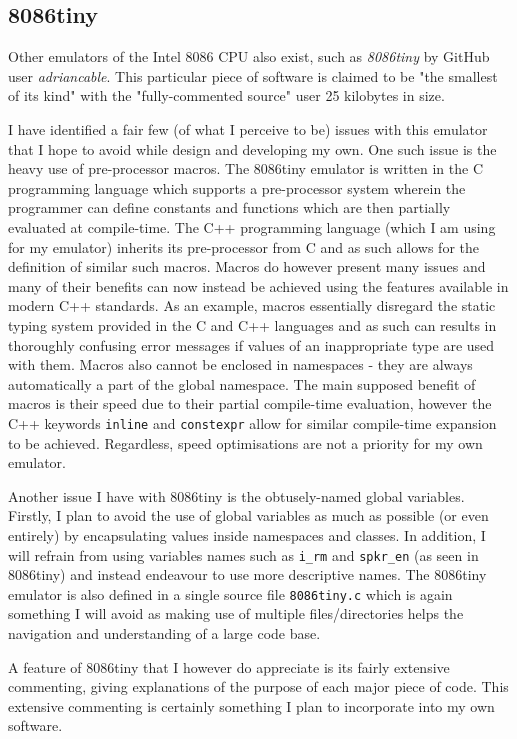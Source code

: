     \subsection{8086tiny}
        Other emulators of the Intel 8086 CPU also exist, such as \textit{8086tiny} by GitHub user \textit{adriancable}. This particular piece of software is claimed to be "the smallest of its kind" with the "fully-commented source" user 25 kilobytes in size.

        I have identified a fair few (of what I perceive to be) issues with this emulator that I hope to avoid while design and developing my own. One such issue is the heavy use of pre-processor macros. The 8086tiny emulator is written in the C programming language which supports a pre-processor system wherein the programmer can define constants and functions which are then partially evaluated at compile-time. The C++ programming language (which I am using for my emulator) inherits its pre-processor from C and as such allows for the definition of similar such macros. Macros do however present many issues and many of their benefits can now instead be achieved using the features available in modern C++ standards. As an example, macros essentially disregard the static typing system provided in the C and C++ languages and as such can results in thoroughly confusing error messages if values of an inappropriate type are used with them. Macros also cannot be enclosed in namespaces - they are always automatically a part of the global namespace. The main supposed benefit of macros is their speed due to their partial compile-time evaluation, however the C++ keywords \texttt{inline} and \texttt{constexpr} allow for similar compile-time expansion to be achieved. Regardless, speed optimisations are not a priority for my own emulator.

        Another issue I have with 8086tiny is the obtusely-named global variables. Firstly, I plan to avoid the use of global variables as much as possible (or even entirely) by encapsulating values inside namespaces and classes. In addition, I will refrain from using variables names such as \texttt{i\_rm} and \texttt{spkr\_en} (as seen in 8086tiny) and instead endeavour to use more descriptive names. The 8086tiny emulator is also defined in a single source file \texttt{8086tiny.c} which is again something I will avoid as making use of multiple files/directories helps the navigation and understanding of a large code base.

        A feature of 8086tiny that I however do appreciate is its fairly extensive commenting, giving explanations of the purpose of each major piece of code. This extensive commenting is certainly something I plan to incorporate into my own software.

